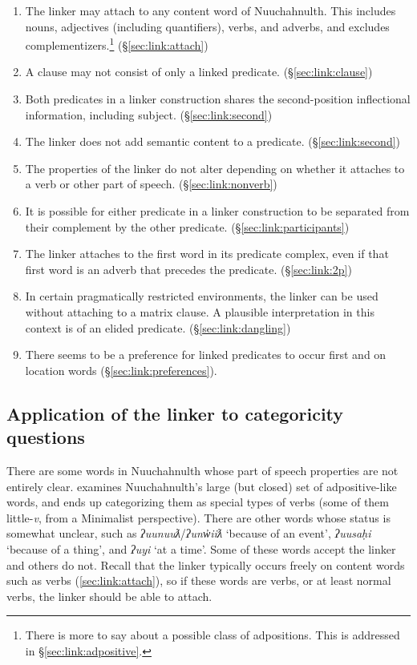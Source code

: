 \begin{enumerate}
	\item The linker may attach to any content word of Nuuchahnulth. This includes nouns, adjectives (including quantifiers), verbs, and adverbs, and excludes complementizers.\footnote{There is more to say about a possible class of adpositions. This is addressed in \S\ref{sec:link:adpositive}.} (\S\ref{sec:link:attach})
	\item A clause may not consist of only a linked predicate. (\S\ref{sec:link:clause})
	\item Both predicates in a linker construction shares the second-position inflectional information, including subject. (\S\ref{sec:link:second})
	\item The linker does not add semantic content to a predicate. (\S\ref{sec:link:second})
	\item The properties of the linker do not alter depending on whether it attaches to a verb or other part of speech. (\S\ref{sec:link:nonverb})
	\item It is possible for either predicate in a linker construction to be separated from their complement by the other predicate. (\S\ref{sec:link:participants})
	\item The linker attaches to the first word in its predicate complex, even if that first word is an adverb that precedes the predicate. (\S\ref{sec:link:2p})
	\item In certain pragmatically restricted environments, the linker can be used without attaching to a matrix clause. A plausible interpretation in this context is of an elided predicate. (\S\ref{sec:link:dangling})
	\item There seems to be a preference for linked predicates to occur first and on location words (\S\ref{sec:link:preferences}).
\end{enumerate}

\subsection{Application of the linker to categoricity questions} \label{sec:link:application}

There are some words in Nuuchahnulth whose part of speech properties are not entirely clear. \cite{woo2007b} examines Nuuchahnulth's large (but closed) set of adpositive-like words, and ends up categorizing them as special types of verbs (some of them little-\textit{v}, from a Minimalist perspective). There are other words whose status is somewhat unclear, such as \textit{ʔuunuuƛ}/\textit{ʔunw̓iiƛ} `because of an event', \textit{ʔuusaḥi} `because of a thing', and \textit{ʔuyi} `at a time'. Some of these words accept the linker and others do not. Recall that the linker typically occurs freely on content words such as verbs (\ref{sec:link:attach}), so if these words are verbs, or at least normal verbs, the linker should be able to attach.

